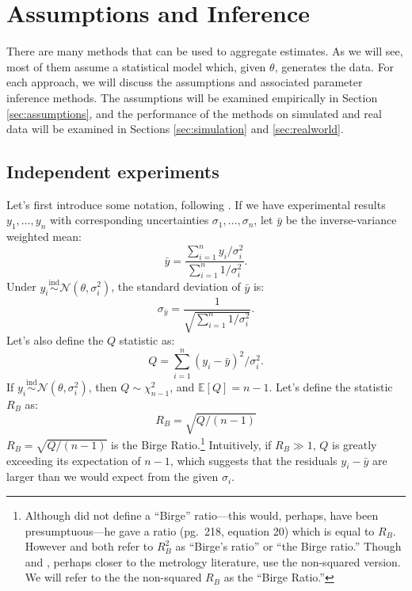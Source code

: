 \documentclass[letterpaper,12pt]{article}
\begin{document}
\section{Assumptions and Inference}\label{sec:methods}

There are many methods that can be used to aggregate estimates. As we will see, most of them assume a statistical model which, given $\theta$, generates the data. For each approach, we will discuss the assumptions and associated parameter inference methods. The assumptions will be examined empirically in Section \ref{sec:assumptions}, and the performance of the methods on simulated and real data will be examined in Sections \ref{sec:simulation} and \ref{sec:realworld}.

\subsection{Independent experiments}

Let's first introduce some notation, following \citet{baker2013meta}. If we have experimental results $y_1,\ldots,y_n$ with corresponding uncertainties $\sigma_1,\ldots,\sigma_n$, let $\bar{y}$ be the inverse-variance weighted mean:
\begin{equation}\label{eq:ybar}
  \bar{y}=\frac{\sum_{i=1}^n y_i/\sigma_i^2}{\sum_{i=1}^n 1/\sigma_i^2}.
\end{equation}
Under $y_i\overset{\mathrm{ind}}\sim\mathcal{N}(\theta,\sigma_i^2)$, the standard deviation of $\bar{y}$ is:
\begin{equation}\label{eq:sigmaybar}
  \sigma_{\bar y}=\frac{1}{\sqrt{\sum_{i=1}^n1/\sigma_i^2}}.
\end{equation}
Let's also define the $Q$ statistic as:
\begin{equation}\label{eq:Q}
  Q=\sum_{i=1}^n (y_i-\bar{y})^2/\sigma_i^2.
\end{equation}
If $y_i\overset{\mathrm{ind}}\sim\mathcal{N}(\theta,\sigma_i^2)$, then $Q\sim\chi^2_{n-1}$, and $\mathbb E[Q]=n-1$. Let's define the statistic $R_B$ as:
\[R_B=\sqrt{Q/(n-1)}\]
$R_B=\sqrt{Q/(n-1)}$ is the Birge Ratio.\footnote{Although \citet{birge1932calculation} did not define a ``Birge'' ratio---this would, perhaps, have been presumptuous---he gave a ratio (pg.~218, equation 20) which is equal to $R_B$. However \citet{baker2013meta} and \citet{hedges1987hard} both refer to $R_B^2$ as ``Birge's ratio'' or ``the Birge ratio.'' Though \citet[Section 3.1]{kacker2002combined} and \citet[Section III.A.1]{taylor1969determination}, perhaps closer to the metrology literature, use the non-squared version. We will refer to the the non-squared $R_B$ as the ``Birge Ratio.''} Intuitively, if $R_B\gg1$, $Q$ is greatly exceeding its expectation of $n-1$, which suggests that the residuals $y_i-\bar{y}$ are larger than we would expect from the given $\sigma_i$.
\end{document}
